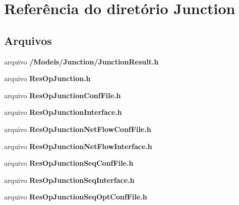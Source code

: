 \section{Referência do diretório Junction}
\label{dir_84248c11bd3665c4e75aea2c32d2f169}
\subsection*{Arquivos}
\begin{DoxyCompactItemize}
\item 
arquivo {\bf /\+Models/\+Junction/\+Junction\+Result.\+h}
\item 
arquivo {\bf Res\+Op\+Junction.\+h}
\item 
arquivo {\bf Res\+Op\+Junction\+Conf\+File.\+h}
\item 
arquivo {\bf Res\+Op\+Junction\+Interface.\+h}
\item 
arquivo {\bf Res\+Op\+Junction\+Net\+Flow\+Conf\+File.\+h}
\item 
arquivo {\bf Res\+Op\+Junction\+Net\+Flow\+Interface.\+h}
\item 
arquivo {\bf Res\+Op\+Junction\+Seq\+Conf\+File.\+h}
\item 
arquivo {\bf Res\+Op\+Junction\+Seq\+Interface.\+h}
\item 
arquivo {\bf Res\+Op\+Junction\+Seq\+Opt\+Conf\+File.\+h}
\end{DoxyCompactItemize}
